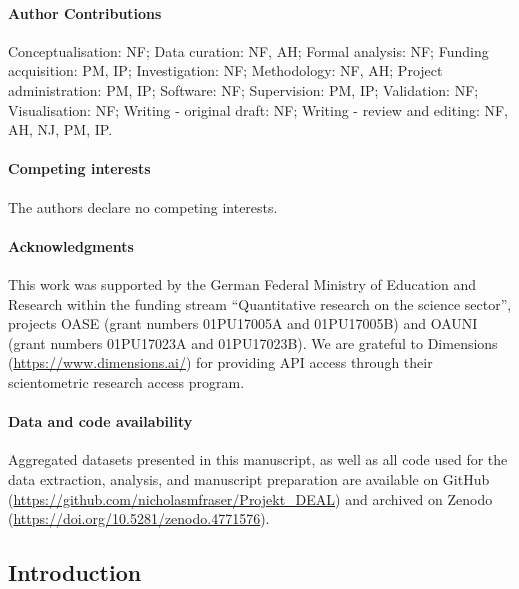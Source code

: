 \documentclass[
]{article}
\begin{document}
\hypertarget{author-contributions}{%
\paragraph{Author Contributions}\label{author-contributions}}

Conceptualisation: NF; Data curation: NF, AH; Formal analysis: NF; Funding acquisition: PM, IP; Investigation: NF; Methodology: NF, AH; Project administration: PM, IP; Software: NF; Supervision: PM, IP; Validation: NF; Visualisation: NF; Writing - original draft: NF; Writing - review and editing: NF, AH, NJ, PM, IP.

\hypertarget{competing-interests}{%
\paragraph{Competing interests}\label{competing-interests}}

The authors declare no competing interests.

\hypertarget{acknowledgments}{%
\paragraph{Acknowledgments}\label{acknowledgments}}

This work was supported by the German Federal Ministry of Education and Research within the
funding stream ``Quantitative research on the science sector'', projects OASE (grant numbers 01PU17005A and 01PU17005B) and OAUNI (grant numbers 01PU17023A and 01PU17023B). We are grateful to Dimensions (\url{https://www.dimensions.ai/}) for providing API access through their scientometric research access program.

\hypertarget{data-and-code-availability}{%
\paragraph{Data and code availability}\label{data-and-code-availability}}

Aggregated datasets presented in this manuscript, as well as all code used for the data extraction, analysis, and manuscript preparation are available on GitHub (\url{https://github.com/nicholasmfraser/Projekt_DEAL}) and archived on Zenodo (\url{https://doi.org/10.5281/zenodo.4771576}).

\pagebreak

\hypertarget{introduction}{%
\subsection{Introduction}\label{introduction}}
\end{document}
